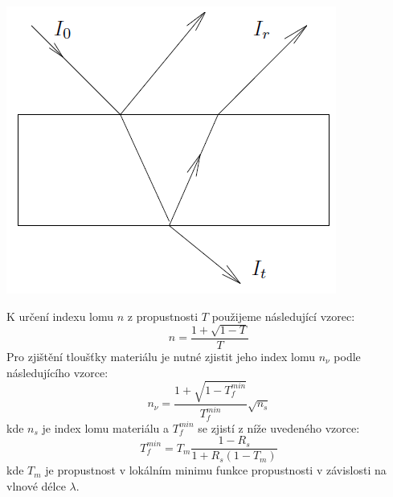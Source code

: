\documentclass[a4paper,11pt]{article}
\begin{document}
    \begin{minipage}[t]{0.5\textwidth} 
                \vspace{0pt}   
                \par \centering
                \includegraphics[scale=0.5]{int}
                \captionsetup{justification=centering, font=footnotesize}
                \label{fig:int}
                \vspace{10pt}
                \raggedright
                \par K určení indexu lomu $n$ z propustnosti $T$ použijeme následující vzorec: 
                \begin{equation}
                    n = \frac{1+\sqrt{1 - T}}{T}
                \end{equation}
                Pro zjištění tloušťky materiálu je nutné zjistit jeho index lomu $n_{\nu}$ podle následujícího vzorce: 
                \begin{equation}
                    n_{\nu} = \frac{1+\sqrt{1 - T^{min}_f}}{T^{min}_f} \sqrt{n_s}
                \end{equation}
                kde $n_s$ je index lomu materiálu a $T^{min}_f$ se zjistí z níže uvedeného vzorce: 
                \begin{equation}
                    T^{min}_f = T_m \frac{1-R_s}{1+R_s (1-T_m)}
                \end{equation}
                kde $T_m$ je propustnost v lokálním minimu funkce propustnosti v závislosti na vlnové délce $\lambda$.
    \end{minipage}
\end{document}
